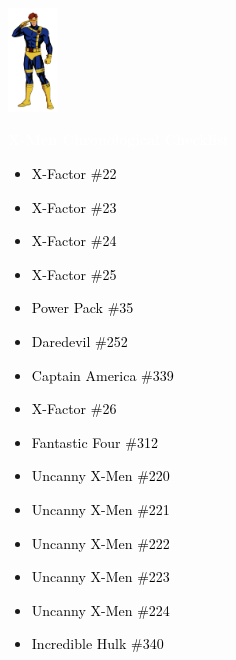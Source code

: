 \documentclass[12pt]{article}
\newcommand{\checkbox}{\raisebox{0.0ex}{\fbox{\rule{0ex}{1.5ex} \rule{1.5ex}{0ex}}}}
\begin{document}
\begin{center}
    \vspace*{2cm}
    \includegraphics[width=0.1\textwidth]{cyclops.png}
    \vspace{0.3cm}

    {\Huge \textbf{\textcolor{white}{X-Men Chronological Checklist}}}
\end{center}

\vspace{0.3cm}
\noindent
\begin{tcolorbox}[
  colback=white!95!gray,
  colframe=black,
  width=\textwidth,
  arc=4mm,
  auto outer arc,
  boxrule=0.8pt,
  left=8pt,right=8pt,top=8pt,bottom=8pt
]
\begin{itemize}[left=0pt,label={\checkbox}]
  \item \textcolor{black}{X-Factor \#22}
  \item \textcolor{black}{X-Factor \#23}
  \item \textcolor{black}{X-Factor \#24}
  \item \textcolor{black}{X-Factor \#25}
  \item \textcolor{black}{Power Pack \#35}
  \item \textcolor{black}{Daredevil \#252}
  \item \textcolor{black}{Captain America \#339}
  \item \textcolor{black}{X-Factor \#26}
  \item \textcolor{black}{Fantastic Four \#312}
  \item \textcolor{black}{Uncanny X-Men \#220}
  \item \textcolor{black}{Uncanny X-Men \#221}
  \item \textcolor{black}{Uncanny X-Men \#222}
  \item \textcolor{black}{Uncanny X-Men \#223}
  \item \textcolor{black}{Uncanny X-Men \#224}
  \item \textcolor{black}{Incredible Hulk \#340}
\end{itemize}
\end{tcolorbox}
\end{document}
